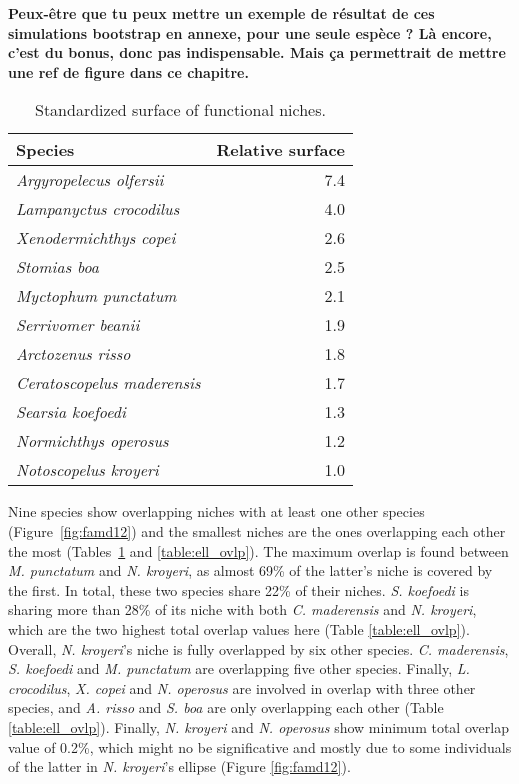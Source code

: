 \textbf{Peux-être que tu peux mettre un exemple de résultat de ces simulations bootstrap en annexe, pour une seule espèce ? Là encore, c'est du bonus, donc pas indispensable. Mais ça permettrait de mettre une ref de figure dans ce chapitre.}

\begin{table}[!htbp]
\centering
\caption[Standardized surface of functional niches]{Standardized surface of functional niches.}
\label{table:sp_surface}
\begin{tabular}{lr}
  \toprule
Species & Relative surface \\ 
  \midrule
  \emph{Argyropelecus olfersii} & 7.4 \\ 
  \emph{Lampanyctus crocodilus} & 4.0 \\ 
  \emph{Xenodermichthys copei} & 2.6 \\ 
  \emph{Stomias boa} & 2.5 \\ 
  \emph{Myctophum punctatum} & 2.1 \\ 
  \emph{Serrivomer beanii} & 1.9 \\ 
  \emph{Arctozenus risso} & 1.8 \\ 
  \emph{Ceratoscopelus maderensis} & 1.7 \\ 
  \emph{Searsia koefoedi} & 1.3 \\ 
  \emph{Normichthys operosus} & 1.2 \\ 
  \emph{Notoscopelus kroyeri} & 1.0 \\ 
   \bottomrule
\end{tabular}
\end{table}

Nine species show overlapping niches with at least one other species (Figure~\ref{fig:famd12}) and the smallest niches are the ones overlapping each other the most (Tables~\ref{table:sp_surface} and \ref{table:ell_ovlp}). The maximum  overlap is found between \textit{M. punctatum} and \textit{N. kroyeri}, as almost 69\% of the latter's niche is covered by the first. In total, these two species share 22\% of their niches. \textit{S. koefoedi} is sharing more than 28\% of its niche with both \textit{C. maderensis} and \textit{N. kroyeri}, which are the two highest total overlap values here (Table \ref{table:ell_ovlp}). Overall, \textit{N. kroyeri}'s niche is fully overlapped by six other species. \textit{C. maderensis}, \textit{S. koefoedi} and \textit{M. punctatum} are overlapping five other species. Finally, \textit{L. crocodilus}, \textit{X. copei} and \textit{N. operosus} are involved in overlap with three other species, and \textit{A. risso} and \textit{S. boa} are only overlapping each other (Table \ref{table:ell_ovlp}). Finally, \textit{N. kroyeri} and \textit{N. operosus} show minimum total overlap value of 0.2\%, which might no be significative and mostly due to some individuals of the latter in \textit{N. kroyeri}'s ellipse (Figure \ref{fig:famd12}). 

